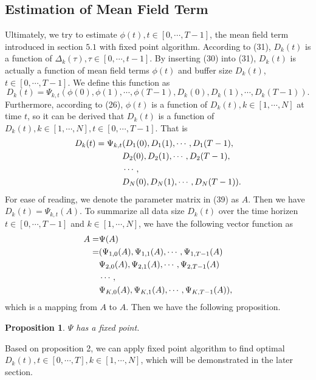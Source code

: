 \documentclass{article}
\theoremstyle{plain}
\newtheorem{proposition}[theorem]{Proposition}
\theoremstyle{definition}
\theoremstyle{remark}
\begin{document}
\subsection{Estimation of Mean Field Term}
Ultimately, we try to estimate $\phi(t), t\in[0,\cdots,T-1]$, the mean field term introduced in section $5.1$ with fixed point algorithm.
According to (31), $D_k(t)$ is a function of $\Delta_k(\tau), \tau \in [0,\cdots,t-1]$. By inserting (30) into (31), $D_k(t)$ is actually a function of mean field terms $\phi(t)$ and buffer size $D_k(t)$, $t \in [0, \cdots, T-1]$.
We define this function as
\begin{equation}
  D_k(t) = \Psi_{k,t}(\phi(0), \phi(1), \cdots, \phi(T-1), D_k(0), D_k(1), \cdots, D_k(T-1)).
\end{equation}
Furthermore, according to (26), $\phi(t)$ is a function of $D_k(t), k \in [1, \cdots, N]$ at time $t$, so it can be derived that $D_k(t)$ is a function of $D_k(t), k \in [1, \cdots, N], t \in [0, \cdots, T-1]$. That is
\begin{align}
  D_k(t) = \Psi_{k,t} & (D_1(0), D_1(1), \cdots, D_1(T-1), \notag \\
                      & D_2(0), D_2(1), \cdots, D_2(T-1), \notag \\
                      & \cdots, \notag \\
                      & D_N(0), D_N(1), \cdots, D_N(T-1)).
\end{align}
For ease of reading, we denote the parameter matrix in (39) as $A$. Then we have $D_k(t) = \Psi_{k,t}(A)$.
To summarize all data size $D_k(t)$ over the time horizen $t \in [0, \cdots, T-1]$ and $k \in [1, \cdots, N]$, we have the following vector function as
\begin{align}
  A = & \Psi(A) \notag \\
    = & (\Psi_{1, 0}(A), \Psi_{1, 1}(A), \cdots, \Psi_{1, T-1}(A) \notag \\
      & \Psi_{2, 0}(A), \Psi_{2, 1}(A), \cdots, \Psi_{2, T-1}(A) \notag \\
      & \cdots, \notag \\
      & \Psi_{K, 0}(A), \Psi_{K, 1}(A), \cdots, \Psi_{K, T-1}(A)),
\end{align}
which is a mapping from $A$ to $A$.
Then we have the following proposition.
\begin{proposition}
  $\Psi$ has a fixed point.
\end{proposition}
Based on proposition 2, we can apply fixed point algorithm to find optimal $D_k(t), t \in [0,\cdots,T], k \in [1, \cdots, N]$, which will be demonstrated in the later section.
\end{document}
